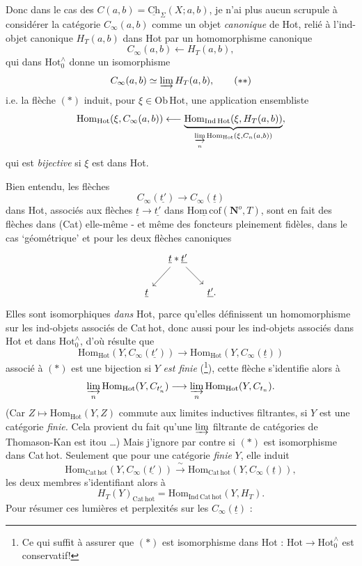 \documentclass[11pt]{article}
\newcommand{\printedpage}[1]{\marginpar{\footnotesize p.~#1}}
\newcommand{\msp}[1]{\marginpar{\footnotesize [#1]}}
\newcommand{\Hotz}{\mathrm{Hot}^{\wedge}_{0}}
\newcommand{\Hot}{\mathrm{Hot}}
\newcommand{\Hc}{\underline{\mathrm{Hom\,cof}}}
\newcommand{\No}{\mathbf{N}^o}
\begin{document}
Donc dans le cas des $C(a,b) = \underline{\mathrm{Ch}}_\Sigma(X; a, b)$, je n'ai plus aucun scrupule à considérer la catégorie $C_\infty(a,b)$ comme un objet \textit{canonique} de Hot, relié à l'ind-objet canonique $H_T(a,b)$ dans Hot par un homomorphisme canonique
\[
C_\infty(a,b) \longleftarrow H_T(a,b), \tag*{$(*)$}
\]
qui dans $\Hotz$ donne un isomorphisme
\[
C_\infty(a,b) \simeq \varinjlim H_T(a,b), \tag*{$(**)$}
\]
i.e. la flèche $(*)$ induit, pour $\xi \in \mathrm{Ob}\,\Hot$, une application ensembliste
\[
\mathrm{Hom}_{\Hot}(\xi, C_\infty(a,b)) \longleftarrow \underbrace{\mathrm{Hom}_{\mathrm{Ind}\,\Hot}(\xi, H_T(a,b))}_{\underset{n}{\varinjlim}\, \mathrm{Hom}_{\Hot}(\xi, C_n(a,b))},
\]
qui est \textit{bijective} si $\xi$ est dans Hot.

\printedpage{76}
\msp{page 121}
Bien entendu, les flèches
\[
C_\infty(\underline{t'}) \longrightarrow C_\infty(\underline{t}) \tag*{$(*)$}
\]
dans Hot, associés aux flèches $\underline{t} \longrightarrow \underline{t'}$ dans $\Hc(\No, T)$, sont en fait des flèches dans %
(Cat) elle-même - et même des foncteurs pleinement fidèles, dans le cas ‘géométrique’ et pour les deux flèches canoniques
\[
\begin{tikzcd}[column sep=small]
 & \underline{t} * \underline{t'} \arrow[ld] \arrow[rd] & \\
\underline{t} & & \underline{t'}.
\end{tikzcd}
\]
Elles sont isomorphiques \textit{dans} Hot, parce qu'elles définissent un homomorphisme sur les ind-objets associés de Cat\,hot, donc aussi pour les ind-objets associés dans Hot et dans $\Hotz$, d'où résulte que
\[
\mathrm{Hom}_{\Hot}(Y, C_\infty(\underline{t'})) \longrightarrow \mathrm{Hom}_{\Hot}(Y, C_\infty(\underline{t}))
\]
associé à $(*)$ est une bijection si $Y$ \textit{est finie} (\footnote[26]{Ce qui suffit à assurer que $(*)$ est isomorphisme dans Hot : $\Hot \longrightarrow \Hotz$ est conservatif!}), cette flèche s'identifie alors à
\[
\underset{n}{\varinjlim}\, \mathrm{Hom}_{\Hot}(Y, C_{t'_n}) \longrightarrow \underset{n}{\varinjlim}\, \mathrm{Hom}_{\Hot}(Y, C_{t_n}).
\]
(Car $Z \longmapsto \mathrm{Hom}_{\Hot}(Y, Z)$ commute aux limites inductives filtrantes, si $Y$ est une catégorie \textit{finie.} Cela provient du fait qu'une $\varinjlim$ filtrante de catégories de Thomason-Kan est itou \dots) Mais j'ignore par contre si $(*)$ est isomorphisme dans Cat\,hot. Seulement que pour une catégorie \textit{finie} $Y$, elle induit
\[
\mathrm{Hom}_{\mathrm{Cat\,hot}}(Y, C_\infty(\underline{t'})) \xrightarrow{\ \sim\ } \mathrm{Hom}_{\mathrm{Cat\,hot}}(Y, C_\infty(\underline{t})),
\]
les deux membres s'identifiant alors à
\msp{page 122}
\[
H_T(Y)_{\mathrm{Cat\,hot}} = \mathrm{Hom}_{\mathrm{Ind\,Cat\,hot}}(Y, H_T).
\]
Pour résumer ces lumières et perplexités sur les $C_\infty(\underline{t})$ :
\end{document}
